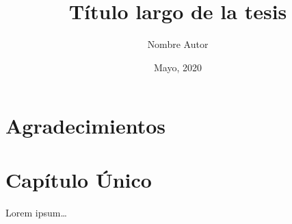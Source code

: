 \documentclass[12pt,letterpaper,twoside,openright,oldfontcommands]{memoir}
\title{Título largo de la tesis}
\author{Nombre Autor}
\date{Mayo, 2020}
\begin{document}
    \maketitle
    \frontmatter
    \tableofcontents
    \chapter{Agradecimientos}
    \mainmatter
    \chapter{Capítulo Único}
    Lorem ipsum…
\end{document}
